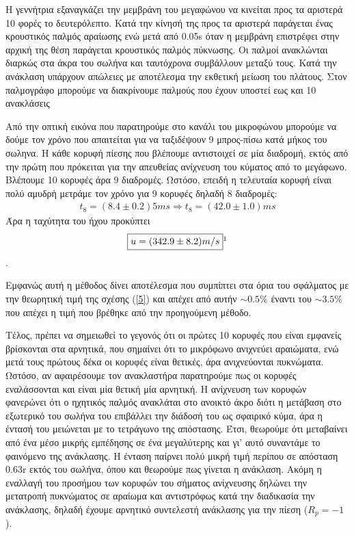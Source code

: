 \documentclass[a4paper]{article}
\begin{document}
 Η γεννήτρια εξαναγκάζει την μεμβράνη του μεγαφώνου να κινείται προς τα αριστερά 10 φορές το δευτερόλεπτο. Κατά την κίνησή της προς τα αριστερά παράγεται ένας κρουστικός παλμός αραίωσης ενώ μετά από 0.05s όταν η μεμβράνη επιστρέφει στην αρχική της θέση παράγεται κρουστικός παλμός πύκνωσης. 
Οι παλμοί ανακλώνται διαρκώς στα άκρα του σωλήνα και ταυτόχρονα συμβάλλουν μεταξύ τους. Κατά την ανάκλαση υπάρχουν απώλειες με αποτέλεσμα την εκθετική μείωση του πλάτους.
Στον παλμογράφο μπορούμε να διακρίνουμε παλμούς που έχουν υποστεί εως και 10 ανακλάσεις
 
 Από την οπτική εικόνα που παρατηρούμε στο κανάλι του μικροφώνου μπορούμε να δούμε τον χρόνο που απαιτείται για να ταξιδέψουν 9 μπρος-πίσω κατά μήκος του σωληνα. Η κάθε κορυφή πίεσης που βλέπουμε αντιστοιχεί σε μία διαδρομή, εκτός από την πρώτη που πρόκειται για την απευθείας ανίχνευση του κύματος από το μεγάφωνο. Βλέπουμε 10 κορυφές άρα 9 διαδρομές. Ωστόσο, επειδή η τελευταία κορυφή είναι πολύ αμυδρή μετράμε τον χρόνο για 9 κορυφές δηλαδή 8 διαδρομές:
 \begin{align*}
 t_8=(8.4\pm0.2)5m s \Rightarrow t_8 = (42.0\pm1.0)m s
  \end{align*}
  Άρα η ταχύτητα του ήχου προκύπτει 
  \begin{align*}
  \boxed{u = (342.9\pm8.2) m/s} \footnotemark
  \end{align*}
  .
  
  Εμφανώς αυτή η μέθοδος δίνει αποτέλεσμα που συμπίπτει στα όρια του σφάλματος με την θεωρητική τιμή της σχέσης (\ref{5}) και απέχει από αυτήν $\sim0.5\%$ έναντι του $\sim 3.5\%$ που απέχει η τιμή που βρέθηκε από την προηγούμενη μέθοδο.
  
  Τέλος, πρέπει να σημειωθεί το γεγονός ότι οι πρώτες 10 κορυφές που είναι εμφανείς βρίσκονται στα αρνητικά, που σημαίνει ότι το μικρόφωνο ανιχνεύει αραιώματα, ενώ μετά τους πρώτους δέκα οι κορυφές είναι θετικές, άρα ανιχνεύονται πυκνώματα. 
  Ωστόσο, αν αφαιρέσουμε τον ανακλαστήρα παρατηρούμε πως οι κορυφές εναλάσσονται και είναι μία θετική μία αρνητική. Η ανίχνευση των κορυφών φανερώνει ότι ο ηχητικός παλμός ανακλάται στο ανοικτό άκρο διότι η μετάβαση στο εξωτερικό του σωλήνα του επιβάλλει την διάδοσή του ως σφαιρικό κύμα, άρα η έντασή του μειώνεται με το τετράγωνο της απόστασης. Έτσι, θεωρούμε ότι μεταβαίνει από ένα μέσο μικρής εμπέδησης σε ένα μεγαλύτερης και γι' αυτό συναντάμε το φαινόμενο της ανάκλασης.
   Η ένταση παίρνει πολύ μικρή τιμή περίπου σε απόσταση 0.63r εκτός του σωλήνα, όπου και θεωρούμε πως γίνεται η ανάκλαση. Ακόμη η εναλλαγή του προσήμου των κορυφών του σήματος ανίχνευσης δηλώνει την μετατροπή πυκνώματος σε αραίωμα και αντιστρόφως κατά την διαδικασία την ανάκλασης, δηλαδή έχουμε αρνητικό συντελεστή ανάκλασης για την πίεση ($R_p=-1$).
\end{document}
